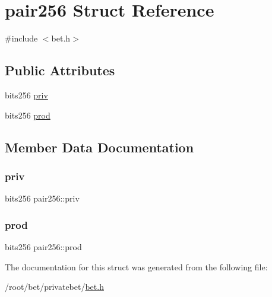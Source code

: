\hypertarget{structpair256}{}\section{pair256 Struct Reference}
\label{structpair256}


{\ttfamily \#include $<$bet.\+h$>$}

\subsection*{Public Attributes}
\begin{DoxyCompactItemize}
\item 
bits256 \hyperlink{structpair256_a08e3b8e0e895b13eebc705b35e6113aa}{priv}
\item 
bits256 \hyperlink{structpair256_a3d40c38f9e09a72c32f584c783528c7a}{prod}
\end{DoxyCompactItemize}


\subsection{Member Data Documentation}
\mbox{\label{structpair256_a08e3b8e0e895b13eebc705b35e6113aa}} 
\subsubsection{\texorpdfstring{priv}{priv}}
{\footnotesize\ttfamily bits256 pair256\+::priv}

\mbox{\label{structpair256_a3d40c38f9e09a72c32f584c783528c7a}} 
\subsubsection{\texorpdfstring{prod}{prod}}
{\footnotesize\ttfamily bits256 pair256\+::prod}



The documentation for this struct was generated from the following file\+:\begin{DoxyCompactItemize}
\item 
/root/bet/privatebet/\hyperlink{bet_8h}{bet.\+h}\end{DoxyCompactItemize}
